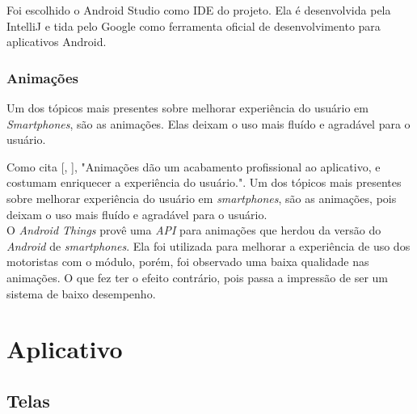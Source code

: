 \documentclass[
	12pt,				%
	oneside,			%
	a4paper,			%
	brazil				%
]{abntex2}
\newcommand{\citecustom}[1]{[\citeauthoronline{#1}, \citeyear{#1}]}
\begin{document}
{Foi escolhido o Android Studio como IDE do projeto. Ela é desenvolvida pela IntelliJ e tida pelo Google como ferramenta oficial de desenvolvimento para aplicativos Android.

\subsubsection{Animações}

Um dos tópicos mais presentes sobre melhorar experiência do usuário em \textit{Smartphones}, são as animações. Elas deixam o uso mais fluído e agradável para o usuário. 

Como cita \citecustom{Lecheta2015}, "Animações dão um acabamento profissional ao aplicativo, e costumam enriquecer a experiência do usuário.". Um dos tópicos mais presentes sobre melhorar experiência do usuário em \textit{smartphones}, são as animações, pois deixam o uso mais fluído e agradável para o usuário. \\

O \textit{Android Things} provê uma \textit{API} para animações que herdou da versão do \textit{Android} de \textit{smartphones}. Ela foi utilizada para melhorar a experiência de uso dos motoristas com o módulo, porém, foi observado uma baixa qualidade nas animações. O que fez ter o efeito contrário, pois passa a impressão de ser um sistema de baixo desempenho.\\

\newpage

\section{Aplicativo}

\subsection{Telas}

}
\end{document}
